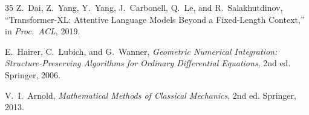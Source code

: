 \documentclass[11pt,letterpaper]{article}
\begin{document}
\begin{thebibliography}{35}
Z.~Dai, Z.~Yang, Y.~Yang, J.~Carbonell, Q.~Le, and R.~Salakhutdinov, ``Transformer-XL: Attentive Language Models Beyond a Fixed-Length Context,'' in \emph{Proc.\ ACL}, 2019.

E.~Hairer, C.~Lubich, and G.~Wanner, \emph{Geometric Numerical Integration: Structure-Preserving Algorithms for Ordinary Differential Equations}, 2nd ed. Springer, 2006.

V.~I.~Arnold, \emph{Mathematical Methods of Classical Mechanics}, 2nd ed. Springer, 2013.

\end{thebibliography}
\end{document}
